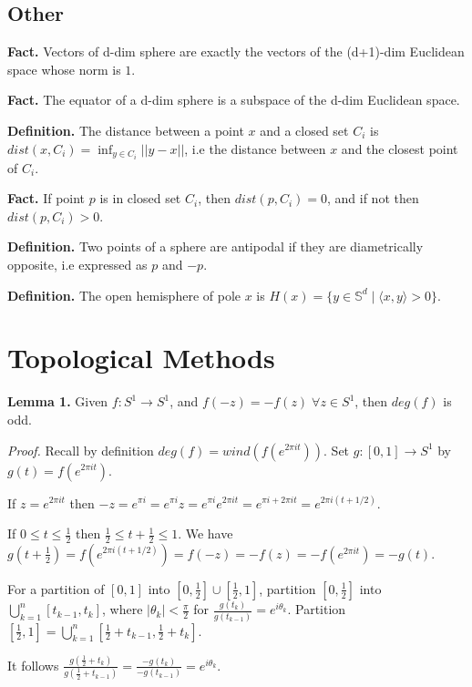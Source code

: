 \documentclass[12pt]{extarticle}
\begin{document}
\subsection{Other}

\textbf{Fact.} Vectors of d-dim sphere are exactly the vectors of the (d+1)-dim Euclidean space whose norm is $1$.

\textbf{Fact.} The equator of a d-dim sphere is a subspace of the d-dim Euclidean space.

\textbf{Definition.} The distance between a point $x$ and a closed set $C_i$ is $dist(x,C_i) = \inf_{y \in C_i} ||y-x||$, i.e the distance between $x$ and the closest point of $C_i$.

\textbf{Fact.} If point $p$ is in closed set $C_i$, then $dist(p, C_i) = 0$, and if not then $dist(p, C_i) > 0$.

\textbf{Definition.} Two points of a sphere are antipodal if they are diametrically opposite, i.e expressed as $p$ and $-p$.

\textbf{Definition.} The open hemisphere of pole $x$ is $H(x) = \{ y \in \mathbb{S}^d \mid \langle x,y \rangle > 0 \}$.


\section{Topological Methods}

\textbf{Lemma 1.} Given $f: S^1 \rightarrow S^1$, and $f(-z) = -f(z) \; \forall z \in S^1$, then $deg(f)$ is odd.

\textit{Proof.} Recall by definition $deg(f) = wind(f(e^{2 \pi it}))$. Set $g:[0,1] \rightarrow S^1$ by $g(t) = f(e^{2 \pi it})$.

If $z = e^{2\pi it}$ then $-z = e^{\pi i} = e^{\pi i}z = e^{\pi i} e^{2 \pi it} = e^{\pi i + 2 \pi it} = e^{2 \pi i (t + 1/2)}$.

If $0 \leq t \leq \frac{1}{2}$ then $\frac{1}{2} \leq t+\frac{1}{2} \leq 1$. We have $g(t+\frac{1}{2}) = f(e^{2 \pi i (t + 1/2)}) = f(-z) = -f(z) = -f(e^{2\pi it}) = -g(t)$.

For a partition of $[0,1]$ into $[0,\frac{1}{2}] \cup [\frac{1}{2}, 1]$, partition $[0, \frac{1}{2}]$ into $\bigcup_{k=1}^n [t_{k-1}, t_k]$, where $|\theta_k| < \frac{\pi}{2}$ for $\frac{g(t_k)}{g(t_{k-1})} = e^{i \theta_k}$. Partition $[\frac{1}{2}, 1] = \bigcup_{k=1}^n [\frac{1}{2} + t_{k-1}, \frac{1}{2} + t_k]$.

It follows $\frac{g(\frac{1}{2} + t_k)}{g(\frac{1}{2} + t_{k-1})} = \frac{-g(t_k)}{-g(t_{k-1})} = e^{i \theta_k}$.
\end{document}

